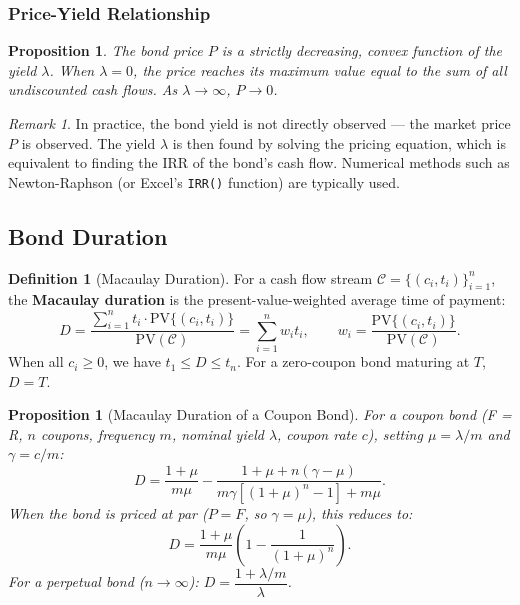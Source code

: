 \documentclass[12pt, a4paper]{article}
\theoremstyle{plain}
\newtheorem{proposition}[theorem]{Proposition}
\theoremstyle{definition}
\newtheorem{definition}[theorem]{Definition}
\theoremstyle{remark}
\newtheorem{remark}[theorem]{Remark}
\begin{document}
\subsubsection{Price-Yield Relationship}

\begin{proposition}
  The bond price $P$ is a strictly \emph{decreasing}, \emph{convex} function of the yield $\lambda$. When $\lambda = 0$, the price reaches its maximum value equal to the sum of all undiscounted cash flows. As $\lambda \to \infty$, $P \to 0$.
\end{proposition}

\begin{remark}
  In practice, the bond yield is not directly observed — the market price $P$ is observed. The yield $\lambda$ is then found by solving the pricing equation, which is equivalent to finding the IRR of the bond's cash flow. Numerical methods such as Newton-Raphson (or Excel's \texttt{IRR()} function) are typically used.
\end{remark}

\subsection{Bond Duration}

\begin{definition}[Macaulay Duration]
  For a cash flow stream $\mathcal{C} = \{(c_i, t_i)\}_{i=1}^n$, the \textbf{Macaulay duration} is the present-value-weighted average time of payment:
  \[
    D = \frac{\sum_{i=1}^n t_i \cdot \mathrm{PV}\{(c_i,t_i)\}}{\mathrm{PV}(\mathcal{C})} = \sum_{i=1}^n w_i t_i, \qquad w_i = \frac{\mathrm{PV}\{(c_i, t_i)\}}{\mathrm{PV}(\mathcal{C})}.
  \]
  When all $c_i \geq 0$, we have $t_1 \leq D \leq t_n$. For a zero-coupon bond maturing at $T$, $D = T$.
\end{definition}

\begin{proposition}[Macaulay Duration of a Coupon Bond]
  For a coupon bond (F = R, $n$ coupons, frequency $m$, nominal yield $\lambda$, coupon rate $c$), setting $\mu = \lambda/m$ and $\gamma = c/m$:
  \[
    D = \frac{1+\mu}{m\mu} - \frac{1 + \mu + n(\gamma - \mu)}{m\gamma[(1+\mu)^n - 1] + m\mu}.
  \]
  When the bond is priced at par ($P = F$, so $\gamma = \mu$), this reduces to:
  \[
    D = \frac{1+\mu}{m\mu}\left(1 - \frac{1}{(1+\mu)^n}\right).
  \]
  For a perpetual bond ($n \to \infty$): $D = \dfrac{1+\lambda/m}{\lambda}$.
\end{proposition}
\end{document}
